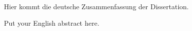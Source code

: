 
\begin{otherlanguage}{ngerman}
  Hier kommt die deutsche Zusammenfassung der Dissertation.
\end{otherlanguage}

\cleardoublepage


Put your English abstract here.

\cleardoublepage
